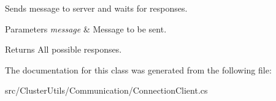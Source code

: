 Sends message to server and waits for responses. 


\begin{DoxyParams}{Parameters}
{\em message} & Message to be sent.\\
\hline
\end{DoxyParams}
\begin{DoxyReturn}{Returns}
All possible responses.
\end{DoxyReturn}


The documentation for this class was generated from the following file\+:\begin{DoxyCompactItemize}
\item 
src/\+Cluster\+Utils/\+Communication/Connection\+Client.\+cs\end{DoxyCompactItemize}

